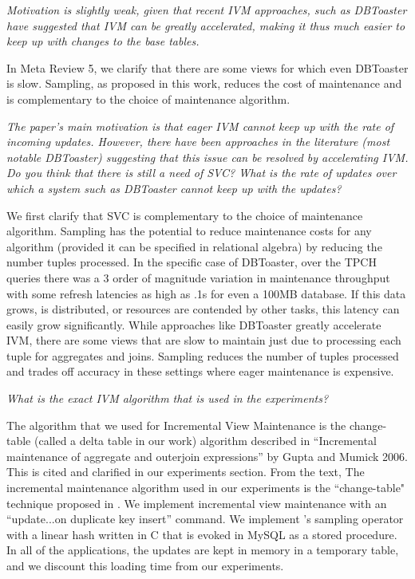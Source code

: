 \vspace{1em}
\emph{Motivation is slightly weak, given that recent IVM approaches, such as DBToaster have suggested that IVM can be greatly accelerated, making it thus much easier to keep up with changes to the base tables.}

In Meta Review 5, we clarify that there are some views for which even DBToaster is slow. Sampling, as proposed in this work, reduces the cost of maintenance and is complementary to the choice of maintenance algorithm.

\vspace{1em}
\emph{The paper's main motivation is that eager IVM cannot keep up with the rate of incoming updates. However, there have been approaches in the literature (most notable DBToaster) suggesting that this issue can be resolved by accelerating IVM. Do you think that there is still a need of SVC? What is the rate of updates over which a system such as DBToaster cannot keep up with the updates?}

We first clarify that SVC is complementary to the choice of maintenance algorithm. Sampling has the potential to reduce maintenance costs for any algorithm (provided it can be specified in relational algebra) by reducing the number tuples processed. In the specific case of DBToaster, over the TPCH queries there was a 3 order of magnitude variation in maintenance throughput with some refresh latencies as high as .1s for even a 100MB database. If this data grows, is distributed, or resources are contended by other tasks, this latency can easily grow significantly. While approaches like DBToaster greatly accelerate IVM, there are some views that are slow to maintain just due to processing each tuple for aggregates and joins. Sampling reduces the number of tuples processed and trades off accuracy in these settings where eager maintenance is expensive.

\vspace{1em}
\emph{What is the exact IVM algorithm that is used in the experiments?}

The algorithm that we used for Incremental View Maintenance is the change-table (called a delta table in our work) algorithm described in “Incremental maintenance of aggregate and outerjoin expressions” by Gupta and Mumick 2006. This is cited and clarified in our experiments section. From the text,
The incremental maintenance algorithm used in our experiments is the ``change-table" technique proposed in \cite{gupta2006incremental}. We implement incremental view maintenance with an ``update...on duplicate key insert'' command. We implement \svc's sampling operator with a linear hash written in C that is evoked in MySQL as a stored procedure. In all of the applications, the updates are kept in memory in a temporary table, and we discount this loading time from our experiments.


